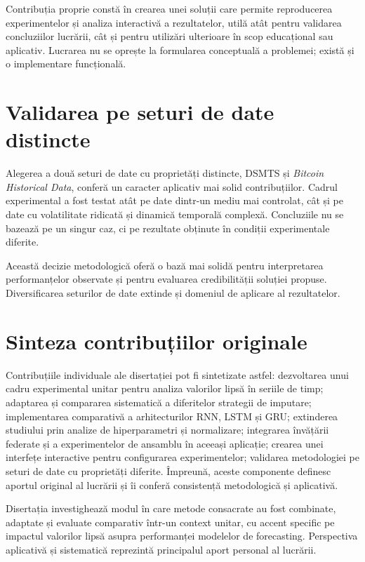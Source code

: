 Contribuția proprie constă în crearea unei soluții care permite reproducerea experimentelor și analiza interactivă a rezultatelor, utilă atât pentru validarea concluziilor lucrării, cât și pentru utilizări ulterioare în scop educațional sau aplicativ. Lucrarea nu se oprește la formularea conceptuală a problemei; există și o implementare funcțională.

\section{Validarea pe seturi de date distincte}

Alegerea a două seturi de date cu proprietăți distincte, DSMTS și \textit{Bitcoin Historical Data}, conferă un caracter aplicativ mai solid contribuțiilor. Cadrul experimental a fost testat atât pe date dintr-un mediu mai controlat, cât și pe date cu volatilitate ridicată și dinamică temporală complexă. Concluziile nu se bazează pe un singur caz, ci pe rezultate obținute în condiții experimentale diferite.

Această decizie metodologică oferă o bază mai solidă pentru interpretarea performanțelor observate și pentru evaluarea credibilității soluției propuse. Diversificarea seturilor de date extinde și domeniul de aplicare al rezultatelor.

\section{Sinteza contribuțiilor originale}

Contribuțiile individuale ale disertației pot fi sintetizate astfel: dezvoltarea unui cadru experimental unitar pentru analiza valorilor lipsă în seriile de timp; adaptarea și compararea sistematică a diferitelor strategii de imputare; implementarea comparativă a arhitecturilor RNN, LSTM și GRU; extinderea studiului prin analize de hiperparametri și normalizare; integrarea învățării federate și a experimentelor de ansamblu în aceeași aplicație; crearea unei interfețe interactive pentru configurarea experimentelor; validarea metodologiei pe seturi de date cu proprietăți diferite. Împreună, aceste componente definesc aportul original al lucrării și îi conferă consistență metodologică și aplicativă.

Disertația investighează modul în care metode consacrate au fost combinate, adaptate și evaluate comparativ într-un context unitar, cu accent specific pe impactul valorilor lipsă asupra performanței modelelor de forecasting. Perspectiva aplicativă și sistematică reprezintă principalul aport personal al lucrării.
